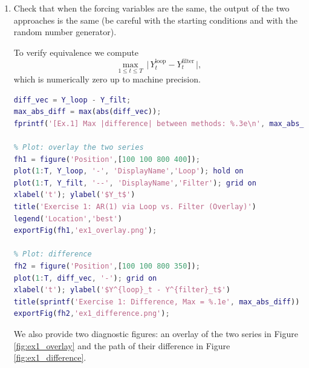 \documentclass[dvipsnames,11pt]{article}
\begin{document}
\begin{enumerate}[label=\alph*.]
\begin{solution}
            \end{solution}

        \item Check that when the forcing variables are the same, the output of the two approaches is the same (be careful with the starting conditions and with the random number generator).

            \begin{solution}

                To verify equivalence we compute
                \[
                  \max_{1\le t\le T}\,\big|\,Y^{\text{loop}}_t - Y^{\text{filter}}_t\,\big|,
                \]
                which is numerically zero up to machine precision.

\begin{lstlisting}[language=Matlab]
diff_vec = Y_loop - Y_filt;
max_abs_diff = max(abs(diff_vec));
fprintf('[Ex.1] Max |difference| between methods: %.3e\n', max_abs_diff);

% Plot: overlay the two series
fh1 = figure('Position',[100 100 800 400]);
plot(1:T, Y_loop, '-', 'DisplayName','Loop'); hold on
plot(1:T, Y_filt, '--', 'DisplayName','Filter'); grid on
xlabel('t'); ylabel('$Y_t$')
title('Exercise 1: AR(1) via Loop vs. Filter (Overlay)')
legend('Location','best')
exportFig(fh1,'ex1_overlay.png');

% Plot: difference
fh2 = figure('Position',[100 100 800 350]);
plot(1:T, diff_vec, '-'); grid on
xlabel('t'); ylabel('$Y^{loop}_t - Y^{filter}_t$')
title(sprintf('Exercise 1: Difference, Max = %.1e', max_abs_diff))
exportFig(fh2,'ex1_difference.png');
\end{lstlisting}

                We also provide two diagnostic figures: an overlay of the two series in Figure \ref{fig:ex1_overlay} and the path of their difference in Figure \ref{fig:ex1_difference}.


\end{solution}
\end{enumerate}
\end{document}
